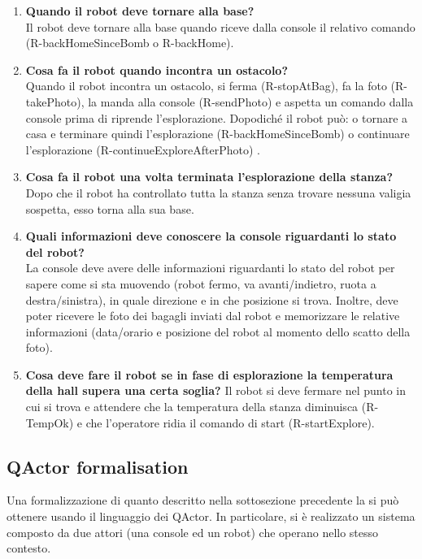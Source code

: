 \begin{enumerate}
\item  \textbf{Quando il robot deve tornare alla base?}\\
Il robot deve tornare alla base quando riceve dalla console il relativo comando (R-backHomeSinceBomb o R-backHome).

\item  \textbf{Cosa fa il robot quando incontra un ostacolo?}\\
Quando il robot incontra un ostacolo, si ferma (R-stopAtBag), fa la foto (R-takePhoto), la manda alla console (R-sendPhoto) e aspetta un comando dalla console prima di riprende l'esplorazione. Dopodiché il robot può: o tornare a casa e terminare quindi l'esplorazione (R-backHomeSinceBomb) o continuare l'esplorazione (R-continueExploreAfterPhoto) .

\item  \textbf{Cosa fa il robot una volta terminata l'esplorazione della stanza?}\\
Dopo che il robot ha controllato tutta la stanza senza trovare nessuna valigia sospetta, esso torna alla sua base. 

\item  \textbf{Quali informazioni deve conoscere la console riguardanti lo stato del  robot?}\\
La console deve avere delle informazioni riguardanti lo stato del robot per sapere come si sta muovendo (robot fermo, va avanti/indietro, ruota a destra/sinistra), in quale direzione e in che posizione si trova. Inoltre, deve poter ricevere le foto dei bagagli inviati dal robot e memorizzare le relative informazioni (data/orario e posizione del robot al momento dello scatto della foto). 

\item  \textbf{Cosa deve fare il robot se in fase di esplorazione la temperatura della hall supera una certa soglia?}
Il robot si deve fermare nel punto in cui si trova e attendere che la temperatura della stanza diminuisca (R-TempOk) e che l'operatore ridia il comando di start (R-startExplore).


\end{enumerate}

\subsection{QActor formalisation}

Una formalizzazione di quanto descritto nella sottosezione precedente la si può ottenere usando il linguaggio dei QActor. In particolare, si è realizzato un sistema composto da due attori (una console ed un robot) che operano nello stesso contesto.





